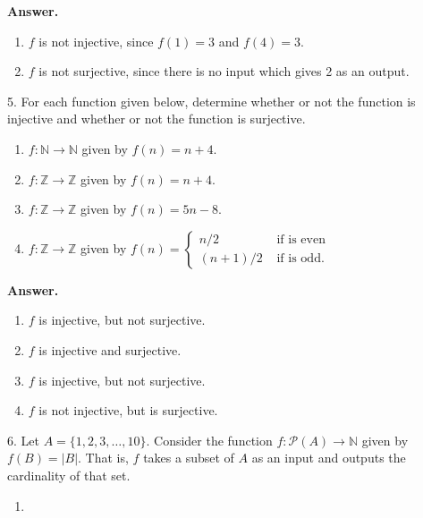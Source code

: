 \documentclass[10pt,]{book}
\theoremstyle{plain}
\theoremstyle{definition}
\theoremstyle{definition}
\theoremstyle{definition}
\numberwithin{equation}{section}
\def\N{\mathbb N}
\def\Z{\mathbb Z}
\def\pow{\mathcal P}
\newcommand{\amp}{ & }
\begin{document}
\begin{exerciselist}
\noindent\textbf{Answer.}\hypertarget{answer-20}{}\quad
\leavevmode%
\begin{enumerate}[label=(\alph*)]
\item\hypertarget{li-143}{}\(f\) is not injective, since \(f(1) = 3\) and \(f(4) = 3\).\item\hypertarget{li-144}{}\(f\) is not surjective, since there is no input which gives 2 as an output.\end{enumerate}
\item[5.]\hypertarget{exercise-21}{}
For each function given below, determine whether or not the function is injective and whether or not the function is surjective.
%
\leavevmode%
\begin{enumerate}[label=(\alph*)]
\item\hypertarget{li-145}{}\(f:\N \to \N\) given by \(f(n) = n+4\).\item\hypertarget{li-146}{}\(f:\Z \to \Z\) given by \(f(n) = n+4\).\item\hypertarget{li-147}{}\(f:\Z \to \Z\) given by \(f(n) = 5n - 8\).\item\hypertarget{li-148}{}\(f:\Z \to \Z\) given by \(f(n) = \begin{cases}n/2 \amp  \mbox{ if  is even} \\
                                         (n+1)/2 \amp  \mbox{ if  is odd} .
\end{cases}\)\end{enumerate}
\par\smallskip
\par\smallskip
\noindent\textbf{Answer.}\hypertarget{answer-21}{}\quad
\leavevmode%
\begin{enumerate}[label=(\alph*)]
\item\hypertarget{li-149}{}\(f\) is injective, but not surjective.\item\hypertarget{li-150}{}\(f\) is injective and surjective.\item\hypertarget{li-151}{}\(f\) is injective, but not surjective.\item\hypertarget{li-152}{}\(f\) is not injective, but is surjective.\end{enumerate}
\item[6.]\hypertarget{exercise-22}{}
Let \(A = \{1,2,3,\ldots,10\}\). Consider the function \(f:\pow(A) \to \N\) given by \(f(B) = |B|\). That is, \(f\) takes a subset of \(A\) as an input and outputs the cardinality of that set.
%
\leavevmode%
\begin{enumerate}[label=(\alph*)]
\item\hypertarget{li-153}{}

\end{enumerate}
\end{exerciselist}
\end{document}
